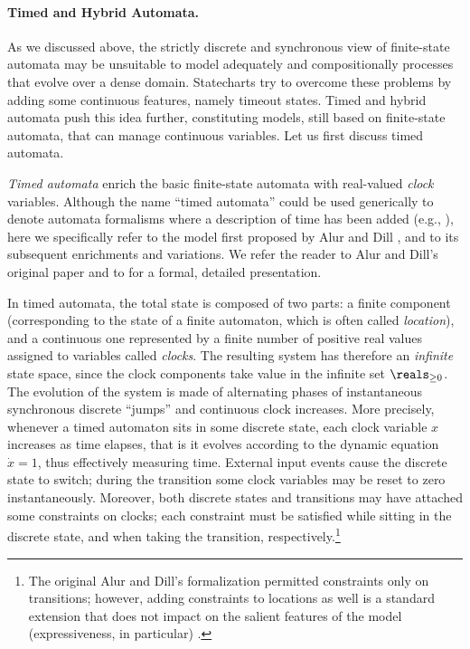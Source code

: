 \paragraph{Timed and Hybrid Automata.}
As we discussed above, the strictly discrete and synchronous view of
finite-state automata may be unsuitable to model adequately and
compositionally processes that evolve over a dense domain.
Statecharts try to overcome these problems by adding some continuous
features, namely timeout states. Timed and hybrid automata push this
idea further, constituting models, still based on finite-state
automata, that can manage continuous variables. Let us first discuss
timed automata.

\emph{Timed automata} enrich the basic finite-state automata with 
real-valued \emph{clock} variables. Although the name ``timed automata'' 
could be used generically to denote automata formalisms where 
a description of time has been added (e.g., \cite{LV96,AH96,Arc00}), 
here we specifically refer to the model first proposed by Alur 
and Dill \cite{AD94}, and to its subsequent enrichments and variations. 
We refer the reader to Alur and Dill's original paper \cite{AD94} and to \cite{BY04} 
for a formal, detailed presentation.

In timed automata, the total state is composed of two parts: 
a finite component (corresponding to the state of a finite automaton, 
which is often called \emph{location}), and a continuous one represented 
by a finite number of positive real values assigned to variables 
called \emph{clocks}. The resulting system has therefore an \emph{infinite} 
state space, since the clock components take value in the infinite 
set $\reals_{\geq 0}$. The evolution of the system is made of alternating phases 
of instantaneous synchronous discrete ``jumps'' and continuous 
clock increases. More precisely, whenever a timed automaton sits 
in some discrete state, each clock variable $x$ increases as 
time elapses, that is it evolves according to the dynamic equation $\dot{x} = 1$, 
thus effectively measuring time. External input events cause 
the discrete state to switch; during the transition some clock 
variables may be reset to zero instantaneously. Moreover, both 
discrete states and transitions may have attached some constraints 
on clocks; each constraint must be satisfied while sitting in 
the discrete state, and when taking the transition, respectively.\footnote{The original Alur and Dill's formalization \cite{AD94} permitted constraints only on transitions; however, adding constraints to locations as well is a standard extension that does not impact on the salient features of the model (expressiveness, in particular) \cite{BY04}.}

